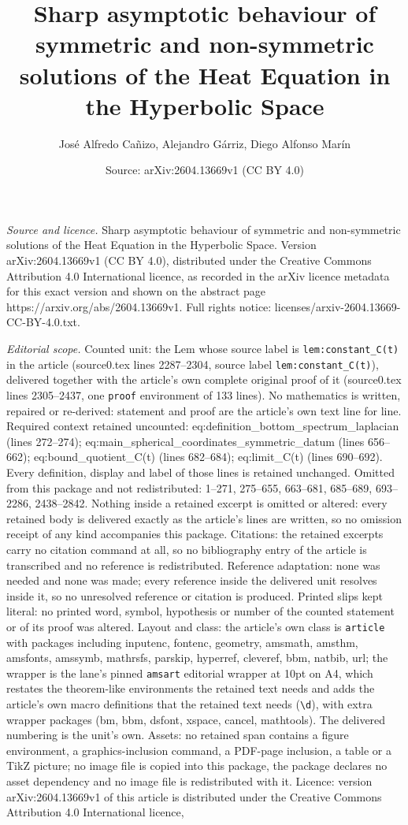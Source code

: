 \documentclass[10pt,a4paper]{amsart}
\title[Sharp asymptotic behaviour of symmetric and non-symmetric so]{Sharp asymptotic behaviour of symmetric and non-symmetric solutions of the Heat Equation in the Hyperbolic Space}
\author{Jos\'e Alfredo Ca\~nizo, Alejandro G\'arriz, Diego Alfonso Mar\'in}
\date{Source: arXiv:2604.13669v1 (CC BY 4.0)}
\begin{document}
\maketitle

\noindent\emph{Source and licence.} Sharp asymptotic behaviour of symmetric and non-symmetric solutions of the Heat Equation in the Hyperbolic Space. Version arXiv:2604.13669v1 (CC BY 4.0), distributed under the Creative Commons Attribution 4.0 International licence, as recorded in the arXiv licence metadata for this exact version and shown on the abstract page https://arxiv.org/abs/2604.13669v1. Full rights notice: licenses/arxiv-2604.13669-CC-BY-4.0.txt.\par\smallskip

\noindent\textit{Editorial scope.} Counted unit: the Lem whose source label is \texttt{lem:constant\_C(t)} in the article (source0.tex lines 2287--2304, source label \texttt{lem:constant\_C(t)}), delivered together with the article's own complete original proof of it (source0.tex lines 2305--2437, one \texttt{proof} environment of 133 lines). No mathematics is written, repaired or re-derived: statement and proof are the article's own text line for line. Required context retained uncounted: eq:definition\_bottom\_spectrum\_laplacian (lines 272--274); eq:main\_spherical\_coordinates\_symmetric\_datum (lines 656--662); eq:bound\_quotient\_C(t) (lines 682--684); eq:limit\_C(t) (lines 690--692). Every definition, display and label of those lines is retained unchanged. Omitted from this package and not redistributed: 1--271, 275--655, 663--681, 685--689, 693--2286, 2438--2842. Nothing inside a retained excerpt is omitted or altered: every retained body is delivered exactly as the article's lines are written, so no omission receipt of any kind accompanies this package. Citations: the retained excerpts carry no citation command at all, so no bibliography entry of the article is transcribed and no reference is redistributed. Reference adaptation: none was needed and none was made; every reference inside the delivered unit resolves inside it, so no unresolved reference or citation is produced. Printed slips kept literal: no printed word, symbol, hypothesis or number of the counted statement or of its proof was altered. Layout and class: the article's own class is \texttt{article} with packages including inputenc, fontenc, geometry, amsmath, amsthm, amsfonts, amssymb, mathrsfs, parskip, hyperref, cleveref, bbm, natbib, url; the wrapper is the lane's pinned \texttt{amsart} editorial wrapper at 10pt on A4, which restates the theorem-like environments the retained text needs and adds the article's own macro definitions that the retained text needs (\texttt{\textbackslash d}), with extra wrapper packages (bm, bbm, dsfont, xspace, cancel, mathtools). The delivered numbering is the unit's own. Assets: no retained span contains a figure environment, a graphics-inclusion command, a PDF-page inclusion, a table or a TikZ picture; no image file is copied into this package, the package declares no asset dependency and no image file is redistributed with it. Licence: version arXiv:2604.13669v1 of this article is distributed under the Creative Commons Attribution 4.0 International licence, 
\end{document}
